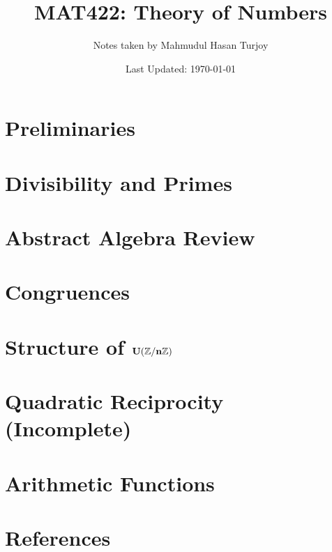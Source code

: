 \documentclass[a4paper]{report}
\title{\bfseries\Huge\sffamily MAT422: Theory of Numbers}
\author{Notes taken by Mahmudul Hasan Turjoy}
\date{Last Updated: \today}
\begin{document}
    \maketitle
    \pagebreak
    
    \pagebreak
    \tableofcontents
    \chapter{Preliminaries}
    \chapter{Divisibility and Primes}
    \chapter{Abstract Algebra Review}
    \chapter{Congruences}
    \chapter{Structure of $\mathbf{U(\mathbb{Z}/n\mathbb{Z})}$}
    \chapter{Quadratic Reciprocity (Incomplete)}
    \chapter{Arithmetic Functions}
    
    
    \chapter{References}
    
\end{document}
